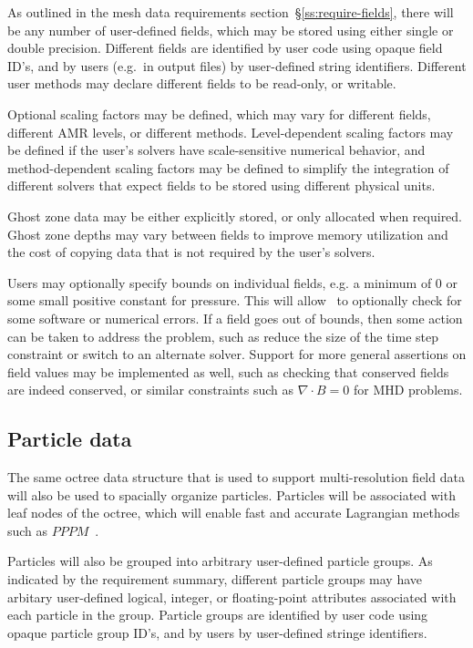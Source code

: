 \documentclass[10pt,twocolumn]{article}
\begin{document}
As outlined in the mesh data requirements
section~\S\ref{ss:require-fields}, there will be any number of
user-defined fields, which may be stored using either single or double
precision.  Different fields are identified by user code using 
opaque field ID's, and by users (e.g.~in output files) by
user-defined string identifiers.  Different user methods may
declare different fields to be read-only, or writable.

Optional scaling factors may be defined, which may vary for different
fields, different AMR levels, or different methods.  Level-dependent
scaling factors may be defined if the user's solvers have
scale-sensitive numerical behavior, and method-dependent scaling
factors may be defined to simplify the integration of different
solvers that expect fields to be stored using different physical
units.

Ghost zone data may be either explicitly stored, or only allocated
when required.  Ghost zone depths may vary between fields to improve
memory utilization and the cost of copying data that is not required
by the user's solvers.  

Users may optionally specify bounds on individual fields, e.g. a
minimum of $0$ or some small positive constant for pressure.  This
will allow \cello\ to optionally check for some software or numerical
errors.  If a field goes out of bounds, then some action can be taken
to address the problem, such as reduce the size of the time step
constraint or switch to an alternate solver.  Support for more general
assertions on field values may be implemented as well, such as checking
that conserved fields are indeed conserved, or similar constraints
such as $\nabla\cdot B=0$ for MHD problems.

\subsection{Particle data} \label{ss:design-particles}

The same octree data structure that is used to support
multi-resolution field data will also be used to spacially organize
particles.  Particles will be associated with leaf nodes of the
octree, which will enable fast and accurate Lagrangian methods such
as $PPPM$~\cite{HoEa88}.

Particles will also be grouped into arbitrary user-defined particle
groups.  As indicated by the requirement summary, different particle
groups may have arbitary user-defined logical, integer, or
floating-point attributes associated with each particle in the group.
Particle groups are identified by user code using opaque particle
group ID's, and by users by user-defined stringe identifiers.
\end{document}
